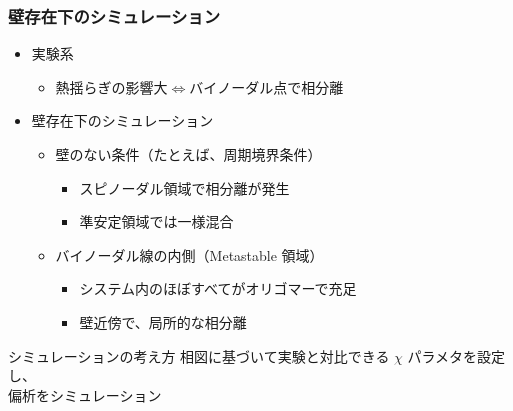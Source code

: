 \documentclass[12pt, dvipdfmx]{beamer}
\begin{document}
%
\begin{frame}
	\frametitle{壁存在下のシミュレーション}
	\begin{itemize}
		\item 実験系
		\begin{itemize}
		\item 熱揺らぎの影響大$\Leftrightarrow$バイノーダル点で相分離
		\end{itemize}
		\item 壁存在下のシミュレーション
		\begin{itemize}
			\item 壁のない条件（たとえば、周期境界条件）
			\begin{itemize}
				\item スピノーダル領域で相分離が発生
				\item 準安定領域では一様混合
			\end{itemize}
			\item バイノーダル線の内側（Metastable 領域）
			\begin{itemize}
				\item システム内のほぼすべてがオリゴマーで充足
				\item 壁近傍で、局所的な相分離
			\end{itemize}
		\end{itemize}
	\end{itemize}

	\begin{alertblock}{シミュレーションの考え方}
	相図に基づいて実験と対比できる $\chi$ パラメタを設定し、\\
	偏析をシミュレーション
	\end{alertblock}
\end{frame}
\end{document}
